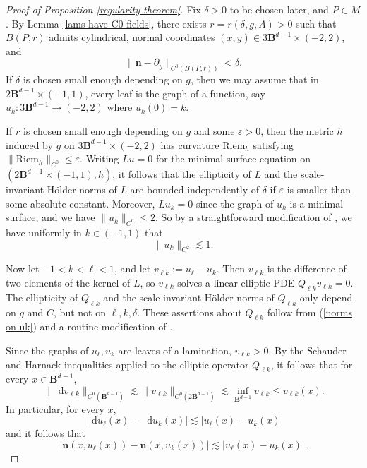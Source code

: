 \documentclass[final,12pt, leqno]{brownthesis}
\newcommand{\Ball}{\mathbf{B}}
\newcommand{\Riem}{\mathrm{Riem}}
\newcommand*\dif{\mathop{}\!\mathrm{d}}
\newcommand{\normal}{\mathbf n}
\theoremstyle{definition}
\numberwithin{equation}{section}
\begin{document}
\begin{proof}[Proof of Proposition \ref{regularity theorem}]
Fix $\delta > 0$ to be chosen later, and $P \in M$.
By Lemma \ref{lams have C0 fields}, there exists $r = r(\delta, g, A) > 0$ such that $B(P, r)$ admits cylindrical, normal coordinates $(x, y) \in 3\Ball^{d - 1} \times (-2, 2)$, and
\begin{equation}\label{normal is almost constant}
\|\normal - \partial_y\|_{C^0(B(P, r))} < \delta.
\end{equation}
If $\delta$ is chosen small enough depending on $g$, then we may assume that in $2\Ball^{d - 1} \times (-1, 1)$,
every leaf is the graph of a function, say $u_k: 3\Ball^{d - 1} \to (-2, 2)$ where $u_k(0) = k$.

If $r$ is chosen small enough depending on $g$ and some $\varepsilon > 0$, then the metric $h$ induced by $g$ on $3\Ball^{d - 1} \times (-2, 2)$ has curvature $\Riem_h$ satisfying $\|\Riem_h\|_{C^0} \leq \varepsilon$.
Writing $Lu = 0$ for the minimal surface equation on $(2\Ball^{d - 1} \times (-1, 1), h)$, it follows that the ellipticity of $L$ and the scale-invariant H\"older norms of $L$ are bounded independently of $\delta$ if $\varepsilon$ is smaller than some absolute constant.
Moreover, $Lu_k = 0$ since the graph of $u_k$ is a minimal surface, and we have $\|u_k\|_{C^0} \leq 2$.
So by a straightforward modification of \cite[Corollary 16.7]{gilbarg2015elliptic}, we have uniformly in $k \in (-1, 1)$ that
\begin{equation}\label{norms on uk}
\|u_k\|_{C^2} \lesssim 1.
\end{equation}

Now let $-1 < k < \ell < 1$, and let $v_{\ell k} := u_\ell - u_k$.
Then $v_{\ell k}$ is the difference of two elements of the kernel of $L$, so $v_{\ell k}$ solves a linear elliptic PDE $Q_{\ell k} v_{\ell k} = 0$.
The ellipticity of $Q_{\ell k}$ and the scale-invariant H\"older norms of $Q_{\ell k}$ only depend on $g$ and $C$, but not on $\ell, k, \delta$.
These assertions about $Q_{\ell k}$ follow from (\ref{norms on uk}) and a routine modification of \cite[Lemma 1.26]{colding2011course}.

Since the graphs of $u_\ell, u_k$ are leaves of a lamination, $v_{\ell k} > 0$.
By the Schauder \cite[Theorem 6.2]{gilbarg2015elliptic} and Harnack \cite[Theorem 9.25]{gilbarg2015elliptic} inequalities applied to the elliptic operator $Q_{\ell k}$, it follows that for every $x \in \Ball^{d - 1}$,
\begin{equation}\label{Schauder Harnack}
	\|\dif v_{\ell k}\|_{C^0(\Ball^{d - 1})} \lesssim \|v_{\ell k}\|_{C^0(2 \Ball^{d - 1})} \lesssim \inf_{\Ball^{d - 1}} v_{\ell k} \leq v_{\ell k}(x).
\end{equation}
In particular, for every $x$,
\begin{equation}\label{bound on du}
|\dif u_\ell(x) - \dif u_k(x)| \lesssim |u_\ell(x) - u_k(x)|
\end{equation}
and it follows that
\begin{equation}\label{vertical Lipschitz}
|\normal(x, u_\ell(x)) - \normal(x, u_k(x))| \lesssim |u_\ell(x) - u_k(x)|.
\end{equation}


\end{proof}
\end{document}
